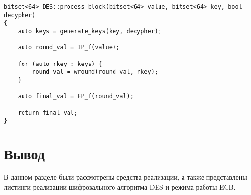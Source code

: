 \begin{lstlisting}[label=lst:process-block,caption=Реализация алгоритма DES]
bitset<64> DES::process_block(bitset<64> value, bitset<64> key, bool decypher)
{
	auto keys = generate_keys(key, decypher);
	
	auto round_val = IP_f(value);
	
	for (auto rkey : keys) {
		round_val = wround(round_val, rkey);
	}
	
	auto final_val = FP_f(round_val);
	
	return final_val;
}
\end{lstlisting}


\section*{Вывод}

В данном разделе были рассмотрены средства реализации, а также представлены листинги реализации шифровального алгоритма DES и режима работы ECB.